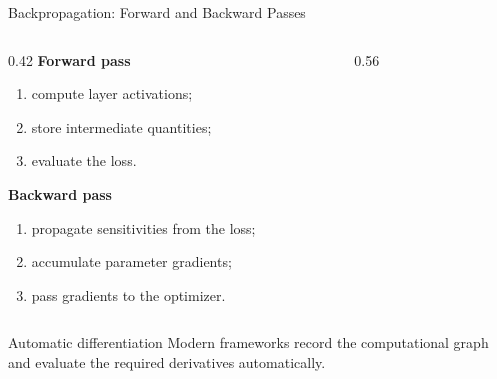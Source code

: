 \begin{frame}{Backpropagation: Forward and Backward Passes}
\begin{columns}
\begin{column}{0.42\textwidth}
\textbf{Forward pass}
\begin{enumerate}
  \item compute layer activations;
  \item store intermediate quantities;
  \item evaluate the loss.
\end{enumerate}

\textbf{Backward pass}
\begin{enumerate}
  \item propagate sensitivities from the loss;
  \item accumulate parameter gradients;
  \item pass gradients to the optimizer.
\end{enumerate}
\end{column}

\begin{column}{0.56\textwidth}
\begin{figure}
\centering
{}
\end{figure}
\end{column}
\end{columns}

\begin{alertblock}{Automatic differentiation}
Modern frameworks record the computational graph and evaluate the required derivatives automatically.
\end{alertblock}
\end{frame}

